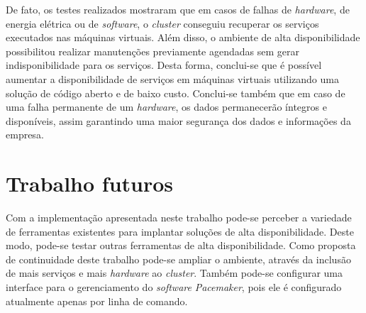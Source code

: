 De fato, os testes realizados mostraram que em casos de falhas de \textit{hardware}, de energia elétrica ou de \textit{software}, 
o \textit{cluster} conseguiu recuperar os serviços executados nas máquinas virtuais. Além disso, o ambiente de alta disponibilidade possibilitou
realizar manutenções previamente agendadas sem gerar indisponibilidade para os serviços.
Desta forma, conclui-se que é possível aumentar a disponibilidade de serviços em máquinas virtuais utilizando uma solução 
de código aberto e de baixo custo.
Conclui-se também que em caso de uma falha permanente de um \textit{hardware}, os dados permanecerão íntegros e disponíveis, assim garantindo 
uma maior segurança dos dados e informações da empresa.


\section{Trabalho futuros}
\label{section:trabalhosfuturos}

Com a implementação apresentada neste trabalho pode-se perceber a variedade de ferramentas existentes para implantar soluções de alta 
disponibilidade. Deste modo, pode-se testar outras ferramentas de alta disponibilidade.
Como proposta de continuidade deste trabalho pode-se ampliar o ambiente, através da inclusão de mais serviços e mais \textit{hardware} ao 
\textit{cluster}. Também pode-se configurar uma interface para o gerenciamento do \textit{software} \textit{Pacemaker}, pois ele é configurado 
atualmente apenas por linha de comando.

